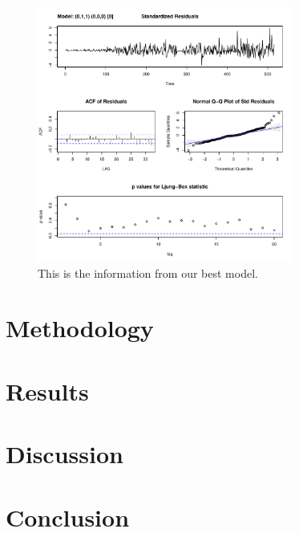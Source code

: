 \documentclass{paper}
\begin{document}
\begin{figure}[t]
\centering
    \includegraphics[width=0.75\textwidth]{../image/best_model.pdf}
\caption{This is the information from our best model.}
\label{outlier}
\end{figure}


\section{Methodology}
\section{Results}
\section{Discussion}
\section{Conclusion}
\end{document}
